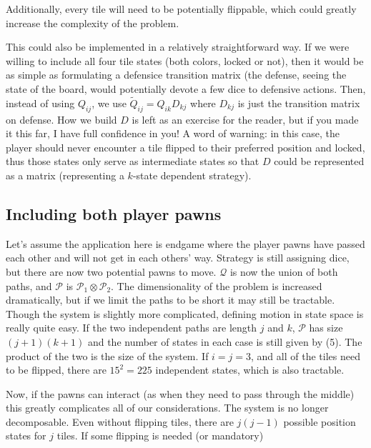 \documentclass[letterpaper,11pt]{article}
\begin{document}
Additionally, every tile will need to be potentially flippable, which could
greatly increase the complexity of the problem.

This could also be implemented in a relatively straightforward way.  If we were
willing to include all four tile states (both colors, locked or not), then it
would be as simple as formulating a defensice transition matrix (the defense,
seeing the state of the board, would potentially devote a few dice to defensive
actions.  Then, instead of using 
$Q_{ij}$, we use $\tilde{Q}_{ij} = Q_{ik}D_{kj}$ where $D_{kj}$ is just the
transition matrix on defense.  How we build $D$ is left as an exercise for the
reader, but if you made it this far, I have full confidence in you!  A word of
warning: in this case, the player should never encounter a tile flipped to
their preferred position and locked, thus those states only serve as
intermediate states so that $D$ could be represented as a matrix (representing
a $k$-state dependent strategy).

\subsection{Including both player pawns}
Let's assume the application here is endgame where the player pawns have
passed each other and will not get in each others' way.  Strategy is still
assigning dice, but there are now two potential pawns to move.  $\mathcal{Q}$ 
is now the union of both paths, and $\mathcal{P}$ is $\mathcal{P}_1\otimes
\mathcal{P}_2$.  The dimensionality of the problem is increased dramatically,
but if we limit the paths to be short it may still be tractable.  Though the
system is slightly more complicated, defining motion in state space is really
quite easy.  If the two independent paths are length $j$ and $k$, $\mathcal{P}$
has size $(j+1)(k+1)$ and the number of states in each case is still given by
(5).  The product of the two is the size of the system.  If $i=j=3$, and all of
the tiles need to be flipped, there are $15^2=225$ independent states, which is
also tractable.

Now, if the pawns can interact (as when they need to pass through the middle)
this greatly complicates all of our considerations.  The system is no longer
decomposable.  Even without flipping tiles, there are $j(j-1)$ possible
position states for $j$ tiles.  If some flipping is needed (or mandatory)
\end{document}
